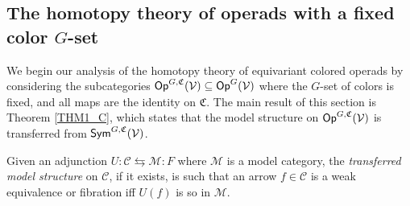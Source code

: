 \documentclass[a4paper,10pt
,draft
]{article}%
\renewcommand{\1}{\eta}%
\begin{document}


 
\subsection{The homotopy theory of operads with a fixed color $G$-set}
\label{MSC_SEC}

We begin our analysis of the homotopy theory of equivariant colored operads by
considering the subcategories $\mathsf{Op}^{G, \mathfrak C}(\mathcal V) \subseteq \mathsf{Op}^G(\mathcal V)$
where the $G$-set of colors is fixed, and all maps are the identity on $\mathfrak C$.
The main result of this section is Theorem \ref{THM1_C}, which states that
the model structure on $\mathsf{Op}^{G, \mathfrak C}(\mathcal V)$ is transferred from $\mathsf{Sym}^{G, \mathfrak C}(\mathcal V)$.

\begin{definition}
      Given an adjunction $U: \mathcal C \leftrightarrows \mathcal M :F$ where $\mathcal M$ is a model category,
      the \textit{transferred model structure} on $\mathcal C$, if it exists, is such that
      an arrow $f \in \mathcal C$ is a weak equivalence or fibration iff $U(f)$ is so in $\mathcal M$.
\end{definition}
\end{document}
